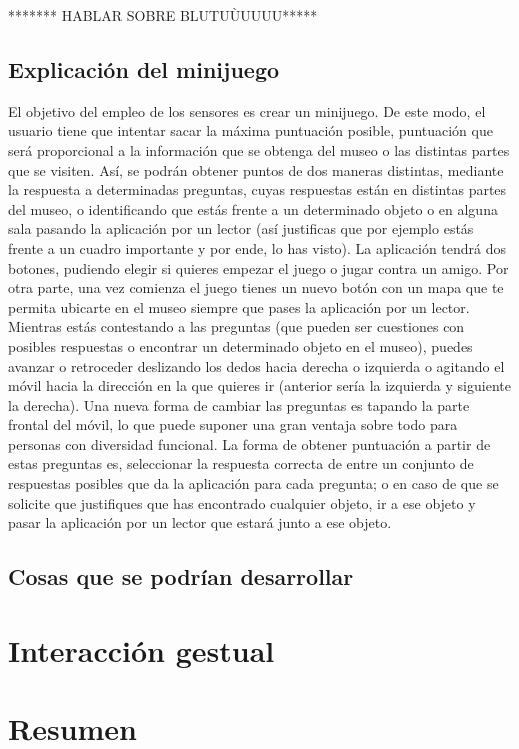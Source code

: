\documentclass{article}
\begin{document}
******* HABLAR SOBRE BLUTUÙUUUU*****

\subsection*{Explicación del minijuego}

El objetivo del empleo de los sensores es crear un minijuego. De este modo, el usuario tiene que intentar sacar la máxima puntuación posible, puntuación que será proporcional a la información que se obtenga del museo o las distintas partes que se visiten. Así, se podrán obtener puntos de dos maneras distintas, mediante la respuesta a determinadas preguntas, cuyas respuestas están en distintas partes del museo, o identificando que estás frente a un determinado objeto o en alguna sala pasando la aplicación por un lector (así justificas que por ejemplo estás frente a un cuadro importante y por ende, lo has visto). La aplicación tendrá dos botones, pudiendo elegir si quieres empezar el juego o jugar contra un amigo. Por otra parte, una vez comienza el juego tienes un nuevo botón con un mapa que te permita ubicarte en el museo siempre que pases la aplicación por un lector. Mientras estás contestando a las preguntas (que pueden ser cuestiones con posibles respuestas o encontrar un determinado objeto en el museo), puedes avanzar o retroceder deslizando los dedos hacia derecha o izquierda o agitando el móvil hacia la dirección en la que quieres ir (anterior sería la izquierda y siguiente la derecha). Una nueva forma de cambiar las preguntas es tapando la parte frontal del móvil, lo que puede suponer una gran ventaja sobre todo para personas con diversidad funcional. La forma de obtener puntuación a partir de estas preguntas es, seleccionar la respuesta correcta de entre un conjunto de respuestas posibles que da la aplicación para cada pregunta; o en caso de que se solicite que justifiques que has encontrado cualquier objeto, ir a ese objeto y pasar la aplicación por un lector que estará junto a ese objeto.

\subsection*{Cosas que se podrían desarrollar}




\section{Interacción gestual}



\section{Resumen}

\newpage
\printbibliography
\end{document}
